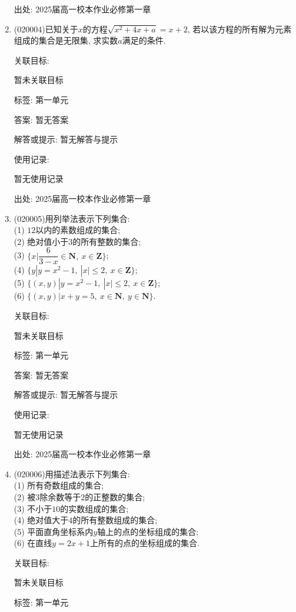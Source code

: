 \documentclass[10pt,a4paper]{article}
\begin{document}
\begin{enumerate}[1.]
出处: 2025届高一校本作业必修第一章
\item { (020004)}已知关于$x$的方程$\sqrt {x^2+4x+a}=x+2$, 若以该方程的所有解为元素组成的集合是无限集, 求实数$a$满足的条件.


关联目标:

暂未关联目标



标签: 第一单元

答案: 暂无答案

解答或提示: 暂无解答与提示

使用记录:

暂无使用记录


出处: 2025届高一校本作业必修第一章
\item { (020005)}用列举法表示下列集合:\\
(1) $12$以内的素数组成的集合;\\
(2) 绝对值小于$3$的所有整数的集合;\\
(3) $\{x|\dfrac 6{3-x}\in\mathbf{N}, \ x\in\mathbf{Z}\}$;\\
(4) $\{y|y=x^2-1 , \ |x| \le 2, \ x\in\mathbf{Z}\}$;\\
(5) $\{( x,y)|y=x^2-1,\ |x|\le 2, \ x\in\mathbf{Z}\}$;\\
(6) $\{( x,y)|x +y=5, \ x\in\mathbf{N}, \ y\in\mathbf{N}\}$.


关联目标:

暂未关联目标



标签: 第一单元

答案: 暂无答案

解答或提示: 暂无解答与提示

使用记录:

暂无使用记录


出处: 2025届高一校本作业必修第一章
\item { (020006)}用描述法表示下列集合:\\
(1) 所有奇数组成的集合;\\
(2) 被$3$除余数等于$2$的正整数的集合;\\
(3) 不小于$10$的实数组成的集合;\\
(4) 绝对值大于$4$的所有整数组成的集合;\\
(5) 平面直角坐标系内$y$轴上的点的坐标组成的集合;\\
(6) 在直线$y=2x+1$上所有的点的坐标组成的集合.


关联目标:

暂未关联目标



标签: 第一单元


\end{enumerate}
\end{document}
